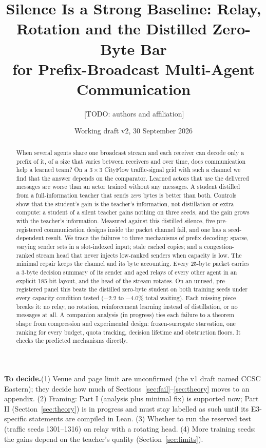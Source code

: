 \documentclass[11pt]{article}
\theoremstyle{definition}
\newif\ifshownotes\shownotestrue
\newcommand{\TODO}[1]{\ifshownotes{\color{todocol}\,\textsf{\footnotesize[TODO: #1]}}\fi}
\newcommand{\TODOPAR}[1]{\ifshownotes\par\vspace{2pt}\noindent%
  {\color{todocol}\textsf{\footnotesize\textbf{To decide.}\;#1}}\par\vspace{2pt}\fi}
\begin{document}
\sloppy
\title{Silence Is a Strong Baseline: Relay, Rotation and the Distilled Zero-Byte Bar\\
for Prefix-Broadcast Multi-Agent Communication}
\author{\TODO{authors and affiliation}}
\date{Working draft v2, 30 September 2026}
\maketitle

\TODOPAR{(1) Venue and page limit are unconfirmed (the v1 draft named CCSC Eastern); they decide how much of
Sections~\ref{sec:fail}--\ref{sec:theory} moves to an appendix. (2) Framing: Part I (analysis plus minimal fix) is
supported now; Part II (Section~\ref{sec:theory}) is in progress and must stay labelled as such until its E3-specific
statements are compiled in Lean. (3) Whether to run the reserved test (traffic seeds 1301--1316) on relay with a rotating
head. (4) More training seeds: the gains depend on the teacher's quality (Section~\ref{sec:limits}).}

\begin{abstract}
When several agents share one broadcast stream and each receiver can decode only a prefix of it, of a size that varies
between receivers and over time, does communication help a learned team? On a $3\times3$ CityFlow traffic-signal grid
with such a channel we find that the answer depends on the comparator. Learned actors that use the delivered messages
are worse than an actor trained without any messages. A student distilled from a full-information teacher that sends
\emph{zero} bytes is better than both. Controls show that the student's gain is the teacher's information, not
distillation or extra compute: a student of a silent teacher gains nothing on three seeds, and the gain grows with the
teacher's information. Measured against this distilled silence, five pre-registered communication designs inside the
packet channel fail, and one has a seed-dependent result. We trace the failures to three mechanisms of prefix decoding:
sparse, varying sender sets in a slot-indexed input; stale cached copies; and a congestion-ranked stream head that never
injects low-ranked senders when capacity is low. The minimal repair keeps the channel and its byte accounting. Every
25-byte packet carries a 3-byte decision summary of its sender and aged relays of every other agent in an explicit
185-bit layout, and the head of the stream rotates. On an unused, pre-registered panel this beats the distilled
zero-byte student on both training seeds under every capacity condition tested ($-2.2$ to $-4.0\%$ total waiting). Each
missing piece breaks it: no relay, no rotation, reinforcement learning instead of distillation, or no messages at all.
A companion analysis (in progress) ties each failure to a theorem shape from compression and experimental design:
frozen-surrogate starvation, one ranking for every budget, quota tracking, decision lifetime and obstruction floors. It
checks the predicted mechanisms directly.
\end{abstract}
\end{document}
